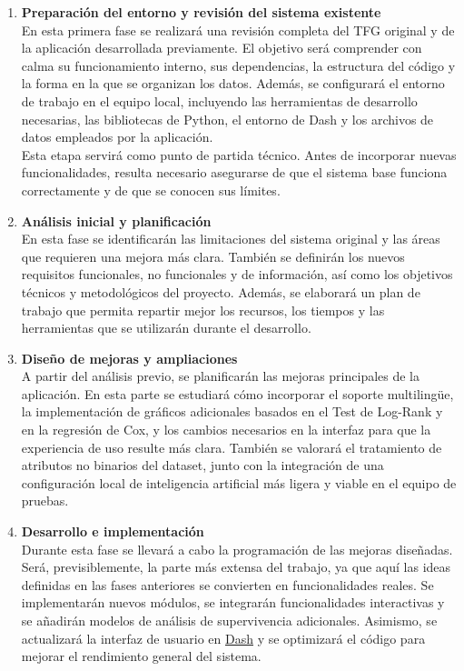 \begin{enumerate}
    \item \textbf{Preparación del entorno y revisión del sistema existente} \\
    En esta primera fase se realizará una revisión completa del TFG original y de la aplicación desarrollada previamente. El objetivo será comprender con calma su funcionamiento interno, sus dependencias, la estructura del código y la forma en la que se organizan los datos. Además, se configurará el entorno de trabajo en el equipo local, incluyendo las herramientas de desarrollo necesarias, las bibliotecas de Python, el entorno de Dash y los archivos de datos empleados por la aplicación. \\
    Esta etapa servirá como punto de partida técnico. Antes de incorporar nuevas funcionalidades, resulta necesario asegurarse de que el sistema base funciona correctamente y de que se conocen sus límites.
    
    \item \textbf{Análisis inicial y planificación} \\
    En esta fase se identificarán las limitaciones del sistema original y las áreas que requieren una mejora más clara. También se definirán los nuevos requisitos funcionales, no funcionales y de información, así como los objetivos técnicos y metodológicos del proyecto. Además, se elaborará un plan de trabajo que permita repartir mejor los recursos, los tiempos y las herramientas que se utilizarán durante el desarrollo.
    
    \item \textbf{Diseño de mejoras y ampliaciones} \\
    A partir del análisis previo, se planificarán las mejoras principales de la aplicación. En esta parte se estudiará cómo incorporar el soporte multilingüe, la implementación de gráficos adicionales basados en el Test de Log-Rank y en la regresión de Cox, y los cambios necesarios en la interfaz para que la experiencia de uso resulte más clara. También se valorará el tratamiento de atributos no binarios del dataset, junto con la integración de una configuración local de inteligencia artificial más ligera y viable en el equipo de pruebas.
    
    \item \textbf{Desarrollo e implementación} \\
    Durante esta fase se llevará a cabo la programación de las mejoras diseñadas. Será, previsiblemente, la parte más extensa del trabajo, ya que aquí las ideas definidas en las fases anteriores se convierten en funcionalidades reales. Se implementarán nuevos módulos, se integrarán funcionalidades interactivas y se añadirán modelos de análisis de supervivencia adicionales. Asimismo, se actualizará la interfaz de usuario en \underline{Dash} y se optimizará el código para mejorar el rendimiento general del sistema.
    

\end{enumerate}
